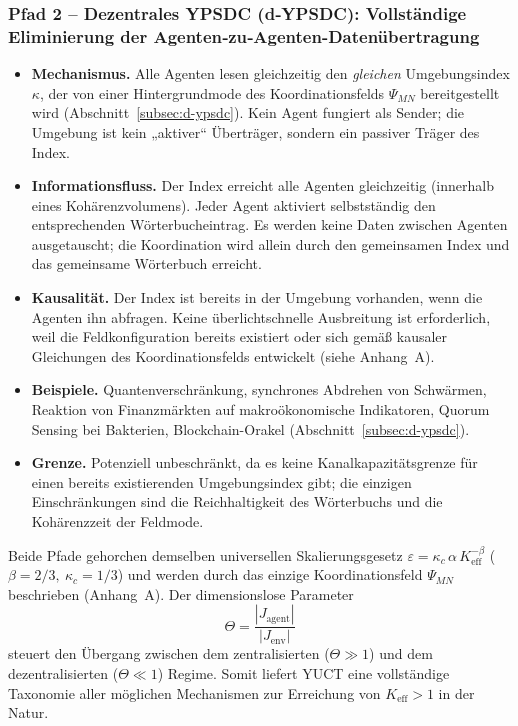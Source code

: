 \documentclass[11pt,a4paper]{article}
\begin{document}
	\subsubsection*{Pfad 2 – Dezentrales YPSDC (d‑YPSDC): Vollständige Eliminierung der Agenten‑zu‑Agenten-Datenübertragung}
	\begin{itemize}[leftmargin=*]
		\item \textbf{Mechanismus.} Alle Agenten lesen gleichzeitig den \emph{gleichen}
		Umgebungsindex \(\kappa\), der von einer Hintergrundmode des Koordinationsfelds \(\Psi_{MN}\) bereitgestellt wird (Abschnitt~\ref{subsec:d-ypsdc}). Kein Agent fungiert als Sender; die Umgebung ist kein „aktiver“ Überträger, sondern ein passiver Träger des Index.
		\item \textbf{Informationsfluss.} Der Index erreicht alle Agenten gleichzeitig (innerhalb eines Kohärenzvolumens). Jeder Agent aktiviert selbstständig den entsprechenden Wörterbucheintrag. Es werden keine Daten zwischen Agenten ausgetauscht; die Koordination wird allein durch den gemeinsamen Index und das gemeinsame Wörterbuch erreicht.
		\item \textbf{Kausalität.} Der Index ist bereits in der Umgebung vorhanden, wenn die Agenten ihn abfragen. Keine überlichtschnelle Ausbreitung ist erforderlich, weil die Feldkonfiguration bereits existiert oder sich gemäß kausaler Gleichungen des Koordinationsfelds entwickelt (siehe Anhang~A).
		\item \textbf{Beispiele.} Quantenverschränkung, synchrones Abdrehen von Schwärmen, Reaktion von Finanzmärkten auf makroökonomische Indikatoren, Quorum Sensing bei Bakterien, Blockchain-Orakel (Abschnitt~\ref{subsec:d-ypsdc}).
		\item \textbf{Grenze.} Potenziell unbeschränkt, da es keine Kanalkapazitätsgrenze für einen bereits existierenden Umgebungsindex gibt; die einzigen Einschränkungen sind die Reichhaltigkeit des Wörterbuchs und die Kohärenzzeit der Feldmode.
	\end{itemize}
	
	\medskip
	\noindent
	Beide Pfade gehorchen demselben universellen Skalierungsgesetz
	\(\varepsilon = \kappa_c \, \alpha \, K_{\mathrm{eff}}^{-\beta}\)
	(\(\beta = 2/3,\ \kappa_c = 1/3\)) und werden durch das einzige Koordinationsfeld \(\Psi_{MN}\) beschrieben (Anhang~A). Der dimensionslose Parameter
	\[
	\Theta = \frac{|J_{\mathrm{agent}}|}{|J_{\mathrm{env}}|}
	\]
	steuert den Übergang zwischen dem zentralisierten (\(\Theta \gg 1\)) und dem dezentralisierten (\(\Theta \ll 1\)) Regime. Somit liefert YUCT eine vollständige Taxonomie aller möglichen Mechanismen zur Erreichung von \(K_{\mathrm{eff}} > 1\) in der Natur.
	
\end{document}
